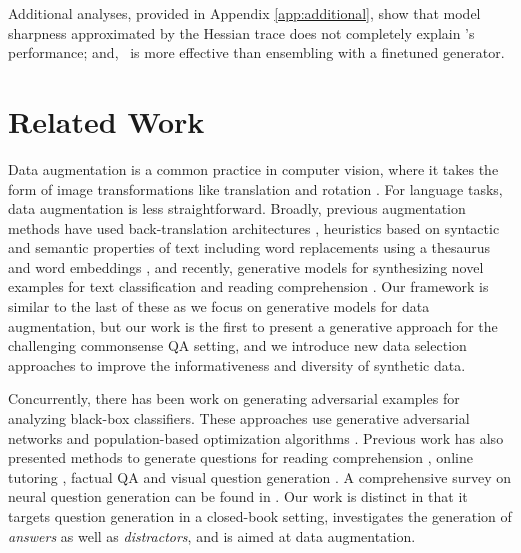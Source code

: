 \documentclass[11pt,a4paper]{article}
\newcommand{\gdaug}{}
\begin{document}
Additional analyses, provided in Appendix \ref{app:additional}, show that model sharpness approximated by the Hessian trace \cite{Yao2019PyHessianNN} does not completely explain \gdaug's performance; and, \gdaug\ is more effective than ensembling with a finetuned generator.  \section{Related Work}
\label{sec:related_work}
Data augmentation is a common practice in computer vision, where it takes the form of image transformations like translation and rotation  \cite{perez2017effectiveness}. 
For language tasks, data augmentation is less straightforward. 
Broadly, previous augmentation methods have used back-translation architectures \cite{sennrich-etal-2016-improving, xie2019unsupervised}, heuristics based on syntactic and semantic properties of text including word replacements using a thesaurus \cite{zhang2015character,wei-zou-2019-eda} and word embeddings \cite{wang-yang-2015-thats, fadaee-bisazza-monz:2017:Short2, kobayashi-2018-contextual, wu2019conditional}, and recently, generative models for synthesizing novel examples for text classification and reading comprehension \cite{AnabyTavor2019NotED, Kumar2020DataAU, puri2020training}. 
Our framework is similar to the last of these as we focus on generative models for data augmentation, but our work is the first to present a generative approach for the challenging commonsense QA setting, and we introduce new data selection approaches to improve the informativeness and diversity of synthetic data. 

Concurrently, there has been work on generating adversarial examples for analyzing black-box classifiers. These approaches use generative adversarial networks \cite{zhao2018generating} and population-based optimization algorithms \cite{alzantot-etal-2018-generating}. Previous work has also presented methods to generate questions for reading comprehension \cite{heilman-smith-2010-good, Rus2012, alberti-etal-2019-synthetic,Puri2020TrainingQA}, online tutoring \cite{lindberg-etal-2013-generating}, factual QA \cite{serban-etal-2016-generating} and visual question generation \cite{mostafazadeh-etal-2016-generating}. A comprehensive survey on neural question generation can be found in \citet{pan2019recent}. Our work is distinct in that it targets question generation in a closed-book setting, investigates the generation of \textit{answers} as well as \textit{distractors}, and is aimed at data augmentation.
\end{document}
